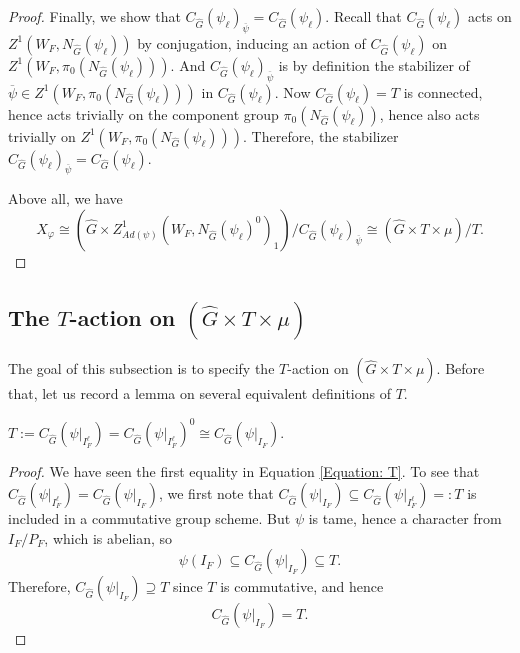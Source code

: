 \begin{theorem}
\begin{proof}
    	Finally, we show that $C_{\hat{G}}(\psi_{\ell})_{\overline{\psi}}=C_{\hat{G}}(\psi_{\ell})$. Recall that $C_{\hat{G}}(\psi_{\ell})$ acts on $Z^1(W_F, N_{\hat{G}}(\psi_{\ell}))$ by conjugation, inducing an action of $C_{\hat{G}}(\psi_{\ell})$ on $Z^1(W_F, \pi_0(N_{\hat{G}}(\psi_{\ell}))).$ And $C_{\hat{G}}(\psi_{\ell})_{\overline{\psi}}$ is by definition the stabilizer of $\overline{\psi} \in Z^1(W_F, \pi_0(N_{\hat{G}}(\psi_{\ell})))$ in $C_{\hat{G}}(\psi_{\ell})$. Now $C_{\hat{G}}(\psi_{\ell})=T$ is connected, hence acts trivially on the component group $\pi_0(N_{\hat{G}}(\psi_{\ell}))$, hence also acts trivially on $Z^1(W_F, \pi_0(N_{\hat{G}}(\psi_{\ell})))$. Therefore, the stabilizer $C_{\hat{G}}(\psi_{\ell})_{\overline{\psi}}=C_{\hat{G}}(\psi_{\ell})$.
    	
    	Above all, we have 
    	$$X_{\varphi} \cong (\hat{G} \times Z^1_{Ad(\psi)}(W_F, N_{\hat{G}}(\psi_{\ell})^0)_1)/C_{\hat{G}}(\psi_{\ell})_{\overline{\psi}} \cong (\hat{G} \times T \times \mu)/T.$$
    \end{proof}
\end{theorem}

\subsection{The $T$-action on $(\hat{G} \times T \times \mu)$}\label{Subsection T-action}

The goal of this subsection is to specify the $T$-action on $(\hat{G} \times T \times \mu)$. Before that, let us record a lemma on several equivalent definitions of $T$.

\begin{lemma}\label{Lemma: T}
	$T:=C_{\hat{G}}(\psi|_{I_F^{\ell}}) = C_{\hat{G}}(\psi|_{I_F^{\ell}})^0 \cong C_{\hat{G}}(\psi|_{I_F}).$
\end{lemma}

\begin{proof}
	We have seen the first equality in Equation \ref{Equation: T}. To see that $C_{\hat{G}}(\psi|_{I_F^{\ell}})=C_{\hat{G}}(\psi|_{I_F})$, we first note that $C_{\hat{G}}(\psi|_{I_F}) \subseteq C_{\hat{G}}(\psi|_{I_F^{\ell}})=:T$ is included in a commutative group scheme. But $\psi$ is tame, hence a character from $I_F/P_F$, which is abelian, so 
	$$\psi(I_F) \subseteq C_{\hat{G}}(\psi|_{I_F}) \subseteq T.$$
	Therefore, $C_{\hat{G}}(\psi|_{I_F}) \supseteq T$ since $T$ is commutative, and hence
	$$C_{\hat{G}}(\psi|_{I_F}) = T.$$
\end{proof}

